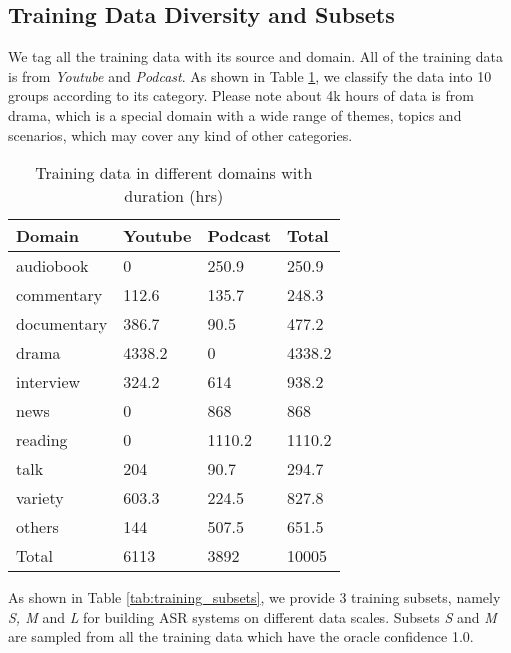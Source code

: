 \documentclass{article}
\begin{document}
\vspace{-1.2em}
\subsection{Training Data Diversity and Subsets}
\vspace{-0.5em}
We tag all the training data with its source and domain.
All of the training data is from \textit{Youtube} and \textit{Podcast}. As shown in Table \ref{tab:source_domain}, 
we classify the data into 10 groups according to its category.
Please note about 4k hours of data is from drama, which is a special domain with a wide range of themes, topics and scenarios, which may cover any kind of other categories.

\begin{table}[t]
\caption{Training data in different domains with duration (hrs)}
\label{tab:source_domain}
\centering
\begin{tabular}{@{}llll@{}}
\toprule[2pt]
Domain      & Youtube & Podcast & Total   \\ \midrule[1pt]
audiobook   & 0       & 250.9   & 250.9   \\
commentary  & 112.6   & 135.7   & 248.3   \\
documentary & 386.7   & 90.5    & 477.2   \\
drama       & 4338.2  & 0       & 4338.2  \\
interview   & 324.2   & 614     & 938.2   \\
news        & 0       & 868     & 868     \\
reading     & 0       & 1110.2  & 1110.2  \\
talk        & 204     & 90.7    & 294.7   \\
variety     & 603.3   & 224.5   & 827.8   \\
others      & 144     & 507.5   & 651.5   \\ \midrule[1pt]
Total       & 6113  & 3892    & 10005 \\
\bottomrule[2pt]
\end{tabular}
\vspace{-1.5em}
\end{table}

As shown in Table \ref{tab:training_subsets}, we provide 3 training subsets, namely \textit{S, M} and \textit{L} for building ASR systems on different data scales.
Subsets \textit{S} and \textit{M} are sampled from all the training data which have the oracle confidence 1.0. 
\end{document}
